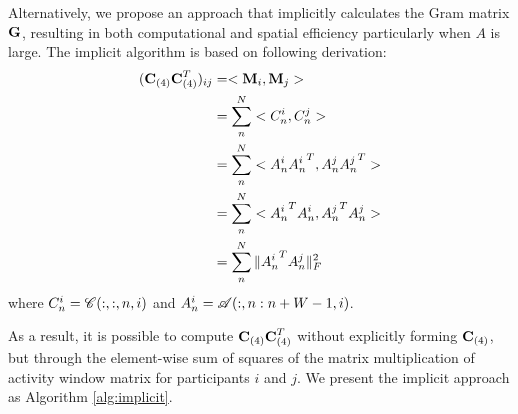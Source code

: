 \documentclass{article}[12pt]
\newcommand{\M}[2][]{{\boldsymbol{#1\mathbf{\MakeUppercase{#2}}}}}
\newcommand{\T}[2][]{\boldsymbol{#1\mathscr{\MakeUppercase{#2}}}}
\newcommand{\Mz}[3][]{\M[#1]{#2}_{(#3)}}
\begin{document}
Alternatively, we propose an approach that implicitly calculates the Gram matrix $\M {G}$, resulting in both computational and spatial efficiency particularly when $A$ is large. The implicit algorithm is based on following derivation:
\begin{align*}
 (\Mz{C}{4} \Mz{C}{4}^T)_{ij} &= <\M{M}_i, \M{M}_j> \\ &= \sum_{n}^{N} <C_n^i, C_n^j>
\\ &=  \sum_{n}^{N} <{A_n^i }{A_n^i}^T,{A_n^j}{A_n^j}^T >
\\ &=  \sum_{n}^{N} <{A_n^i }^T{A_n^i},{A_n^j}^T{A_n^j}>
\\ &=  \sum_{n}^{N} \| {A_n^i}^T{A_n^j} \|_F^2
\end{align*}
where $C_n^i = \T {C}(:,:,n,i)$ and $A_n^i = \T {A}(:,n:n+W-1,i)$. 


As a result, it is possible to compute $\Mz{C}{4} \Mz{C}{4}^T$ without explicitly forming  $\Mz{C}{4}$, but through the element-wise sum of squares of the matrix multiplication of activity window matrix for participants $i$ and $j$.
We present the implicit approach as Algorithm \ref{alg:implicit}.
\end{document}
